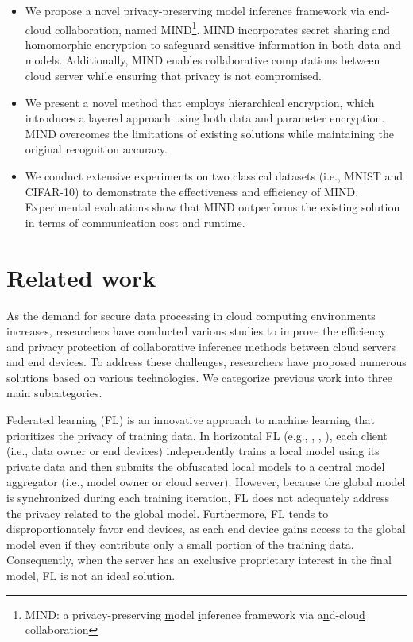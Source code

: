 \documentclass[conference]{IEEEtran}
\begin{document}
\begin{itemize}
    \item We propose a novel privacy-preserving model inference framework via end-cloud collaboration, named MIND\footnote{MIND: a privacy-preserving \underline{m}odel \underline{i}nference framework via a\underline{n}d-clou\underline{d} collaboration}. MIND incorporates secret sharing and homomorphic encryption to safeguard sensitive information in both data and models. Additionally, MIND enables collaborative computations between cloud server while ensuring that privacy is not compromised.
    
    \item We present a novel method that employs hierarchical encryption, which introduces a layered approach using both data and parameter encryption. MIND overcomes the limitations of existing solutions while maintaining the original recognition accuracy.
    
    \item We conduct extensive experiments on two classical datasets (i.e., MNIST and CIFAR-10) to demonstrate the effectiveness and efficiency of MIND. Experimental evaluations show that MIND outperforms the existing solution in terms of communication cost and runtime.  
\end{itemize}
\section{Related work}
As the demand for secure data processing in cloud computing environments increases, researchers have conducted various studies to improve the efficiency and privacy protection of collaborative inference methods between cloud servers and end devices. To address these challenges, researchers have proposed numerous solutions based on various technologies. We categorize previous work into three main subcategories.

Federated learning (FL) is an innovative approach to machine learning that prioritizes the privacy of training data. In horizontal FL (e.g., \cite{pmlr-v54-mcmahan17a}, \cite{Gupta2018DistributedLO}, \cite{9252066}), each client (i.e., data owner or end devices) independently trains a local model using its private data and then submits the obfuscated local models to a central model aggregator (i.e., model owner or cloud server). However, because the global model is synchronized during each training iteration, FL does not adequately address the privacy related to the global model. Furthermore, FL tends to disproportionately favor end devices, as each end device gains access to the global model even if they contribute only a small portion of the training data. Consequently, when the server has an exclusive proprietary interest in the final model, FL is not an ideal solution.
\end{document}
